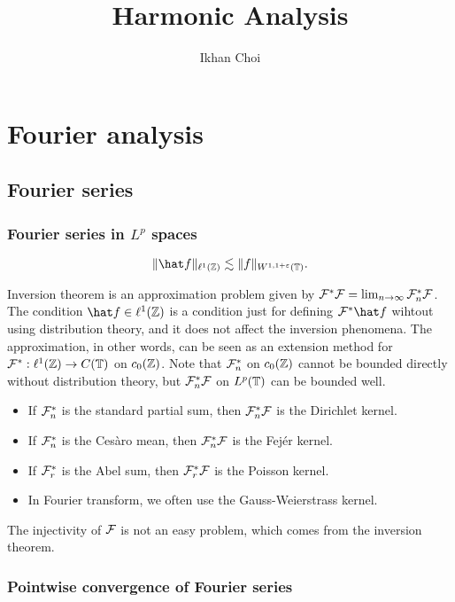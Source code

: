 \documentclass{../../large}
\begin{document}
\title{Harmonic Analysis}
\author{Ikhan Choi}
\maketitle
\tableofcontents

\part{Fourier analysis}

\chapter{Fourier series}

\section{Fourier series in $L^p$ spaces}
\begin{prb}
\[\|\hat f\|_{\ell^1(\Z)}\lesssim\|f\|_{W^{1,1+\e}(\T)}.\]
\end{prb}

Inversion theorem is an approximation problem given by $\mathcal{F}^*\mathcal{F}=\lim_{n\to\infty}\mathcal{F}_n^*\mathcal{F}$.
The condition $\hat f\in\ell^1(\Z)$ is a condition just for defining $\cF^*\hat f$ wihtout using distribution theory, and it does not affect the inversion phenomena.
The approximation, in other words, can be seen as an extension method for $\mathcal{F}^*:\ell^1(\mathbb{Z})\to C(\mathbb{T})$ on $c_0(\mathbb{Z})$.
Note that $\mathcal{F}_n^*$ on $c_0(\mathbb{Z})$ cannot be bounded directly without distribution theory, but $\mathcal{F}_n^*\mathcal{F}$ on $L^p(\mathbb{T})$ can be bounded well.

\begin{itemize}
\item If $\mathcal{F}_n^*$ is the standard partial sum, then $\mathcal{F}_n^*\mathcal{F}$ is the Dirichlet kernel.
\item If $\mathcal{F}_n^*$ is the Ces\`aro mean, then $\mathcal{F}_n^*\mathcal{F}$ is the Fej\'er kernel.
\item If $\mathcal{F}_r^*$ is the Abel sum, then $\mathcal{F}_r^*\mathcal{F}$ is the Poisson kernel.
\item In Fourier transform, we often use the Gauss-Weierstrass kernel.
\end{itemize}

The injectivity of $\mathcal{F}$ is not an easy problem, which comes from the inversion theorem.




\section{Pointwise convergence of Fourier series}
\end{document}
